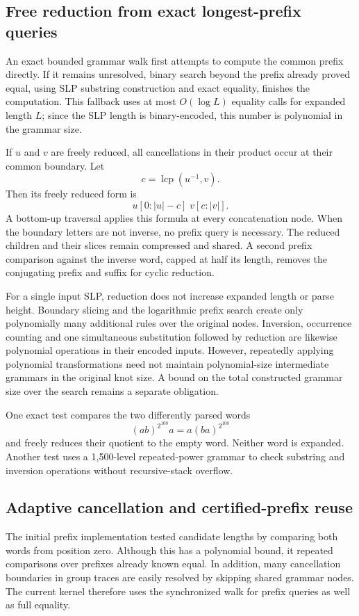 \subsection{Free reduction from exact longest-prefix queries}

An exact bounded grammar walk first attempts to compute the common prefix
directly. If it remains unresolved, binary search beyond the prefix already
proved equal, using SLP substring construction and exact equality, finishes
the computation. This fallback uses at most
$O(\log L)$ equality calls for expanded length $L$; since the SLP length is
binary-encoded, this number is polynomial in the grammar size.

If $u$ and $v$ are freely reduced, all cancellations in their product occur
at their common boundary.  Let
\[
 c=\operatorname{lcp}(u^{-1},v).
\]
Then its freely reduced form is
\[
 u[0:|u|-c]\;v[c:|v|].
\]
A bottom-up traversal applies this formula at every concatenation node.
When the boundary letters are not inverse, no prefix query is necessary.
The reduced children and their slices remain compressed and shared.
A second prefix comparison against the inverse word, capped at half its
length, removes the conjugating prefix and suffix for cyclic reduction.

For a single input SLP, reduction does not increase expanded length or
parse height.  Boundary slicing and the logarithmic prefix search create
only polynomially many additional rules over the original nodes.
Inversion, occurrence counting and one simultaneous substitution followed
by reduction are likewise polynomial operations in their encoded inputs.
However, repeatedly applying polynomial transformations need not maintain
polynomial-size intermediate grammars in the original knot size.  A bound
on the total constructed grammar size over the search remains a separate
obligation.

One exact test compares the two differently parsed words
\[
 (ab)^{2^{100}}a=a(ba)^{2^{100}}
\]
and freely reduces their quotient to the empty word.  Neither word is
expanded.  Another test uses a 1,500-level repeated-power grammar to check
substring and inversion operations without recursive-stack overflow.

\subsection{Adaptive cancellation and certified-prefix reuse}
\label{sec:compressed-prefix}

The initial prefix implementation tested candidate lengths by comparing
both words from position zero. Although this has a polynomial bound, it
repeated comparisons over prefixes already known equal. In addition,
many cancellation boundaries in group traces are easily resolved by
skipping shared grammar nodes. The current kernel therefore uses the
synchronized walk for prefix queries as well as full equality.

